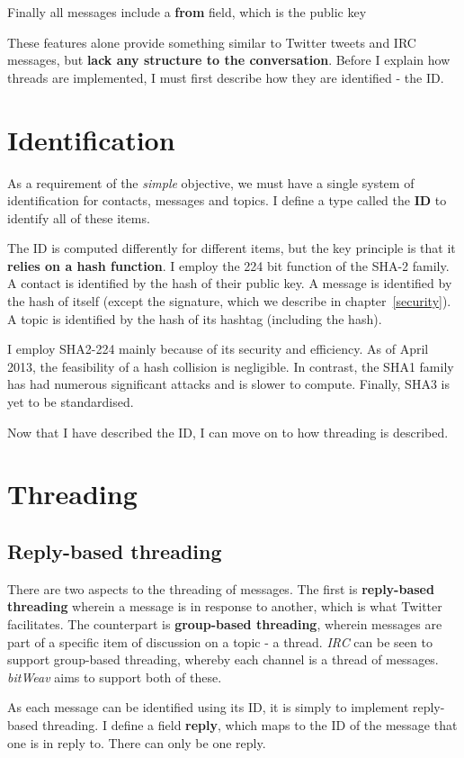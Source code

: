 \documentclass[10pt,a4paper,onecolumn]{article}
\begin{document}
Finally all messages include a \textbf{from} field, which is the public key

These features alone provide something similar to Twitter tweets and IRC messages, but \textbf{lack any structure to the conversation}. Before I explain how threads are implemented, I must first describe how they are identified - the ID.

\section{Identification}
As a requirement of the \emph{simple} objective, we must have a single system of identification for contacts, messages and topics. I define a type called the \textbf{ID} to identify all of these items. 

The ID is computed differently for different items, but the key principle is that it \textbf{relies on a hash function}. I employ the 224 bit function of the SHA-2 family. A contact is identified by the hash of their public key. A message is identified by the hash of itself (except the signature, which we describe in chapter~\ref{security}). A topic is identified by the hash of its hashtag (including the hash). 

I employ SHA2-224 mainly because of its security and efficiency. As of April 2013, the feasibility of a hash collision is negligible. In contrast, the SHA1 family has had numerous significant attacks and is slower to compute. Finally, SHA3 is yet to be standardised. 

Now that I have described the ID, I can move on to how threading is described.

\section{Threading}
\subsection*{Reply-based threading}
There are two aspects to the threading of messages. The first is \textbf{reply-based threading} wherein a message is in response to another, which is what Twitter facilitates. The counterpart is \textbf{group-based threading}, wherein messages are part of a specific item of discussion on a topic - a thread. \textit{IRC} can be seen to support group-based threading, whereby each channel is a thread of messages. \textit{bitWeav} aims to support both of these. 

As each message can be identified using its ID, it is simply to implement reply-based threading. I define a field \textbf{reply}, which maps to the ID of the message that one is in reply to. There can only be one reply. 
\end{document}
